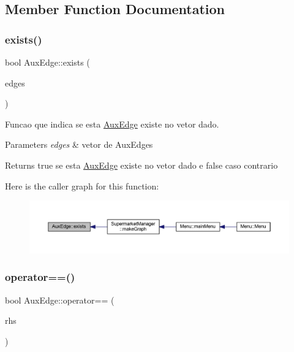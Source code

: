 \subsection{Member Function Documentation}
\mbox{\label{class_aux_edge_ac05b44fbcf9e494b0d92df6359ac9932}} 
\subsubsection{\texorpdfstring{exists()}{exists()}}
{\footnotesize\ttfamily bool Aux\+Edge\+::exists (\begin{DoxyParamCaption}\item[{vector$<$ \hyperlink{class_aux_edge}{Aux\+Edge} $>$}]{edges }\end{DoxyParamCaption})\hspace{0.3cm}{\ttfamily [inline]}}

Funcao que indica se esta \hyperlink{class_aux_edge}{Aux\+Edge} existe no vetor dado.


\begin{DoxyParams}{Parameters}
{\em edges} & vetor de Aux\+Edges \\
\hline
\end{DoxyParams}
\begin{DoxyReturn}{Returns}
true se esta \hyperlink{class_aux_edge}{Aux\+Edge} existe no vetor dado e false caso contrario 
\end{DoxyReturn}
Here is the caller graph for this function\+:
\nopagebreak
\begin{figure}[H]
\begin{center}
\leavevmode
\includegraphics[width=350pt]{class_aux_edge_ac05b44fbcf9e494b0d92df6359ac9932_icgraph}
\end{center}
\end{figure}
\mbox{\label{class_aux_edge_ac5b9bcaa74464f7a5e79ec56d4c87b0d}} 
\subsubsection{\texorpdfstring{operator==()}{operator==()}}
{\footnotesize\ttfamily bool Aux\+Edge\+::operator== (\begin{DoxyParamCaption}\item[{const \hyperlink{class_aux_edge}{Aux\+Edge} \&}]{rhs }\end{DoxyParamCaption})\hspace{0.3cm}{\ttfamily [inline]}}

